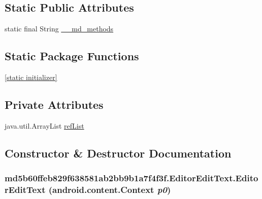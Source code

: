 \subsection*{Static Public Attributes}
\begin{CompactItemize}
\item 
static final String \hyperlink{classmd5b60ffeb829f638581ab2bb9b1a7f4f3f_1_1_editor_edit_text_c38db1db19f69806cc1b75f1a04cebda}{\_\-\_\-md\_\-methods}
\end{CompactItemize}
\subsection*{Static Package Functions}
\begin{CompactItemize}
\item 
\hyperlink{classmd5b60ffeb829f638581ab2bb9b1a7f4f3f_1_1_editor_edit_text_3a913e8148e4f4e1aba30b8717b86dc3}{\mbox{[}static initializer\mbox{]}}
\end{CompactItemize}
\subsection*{Private Attributes}
\begin{CompactItemize}
\item 
java.util.ArrayList \hyperlink{classmd5b60ffeb829f638581ab2bb9b1a7f4f3f_1_1_editor_edit_text_c9c34d4a7a109014d9c3e0fcb9d24cd4}{refList}
\end{CompactItemize}


\subsection{Constructor \& Destructor Documentation}
\hypertarget{classmd5b60ffeb829f638581ab2bb9b1a7f4f3f_1_1_editor_edit_text_f867d7b8157b5de4238185bf6f6676bf}{
\subsubsection[{EditorEditText}]{\setlength{\rightskip}{0pt plus 5cm}md5b60ffeb829f638581ab2bb9b1a7f4f3f.EditorEditText.EditorEditText (android.content.Context {\em p0})}}
\label{classmd5b60ffeb829f638581ab2bb9b1a7f4f3f_1_1_editor_edit_text_f867d7b8157b5de4238185bf6f6676bf}


